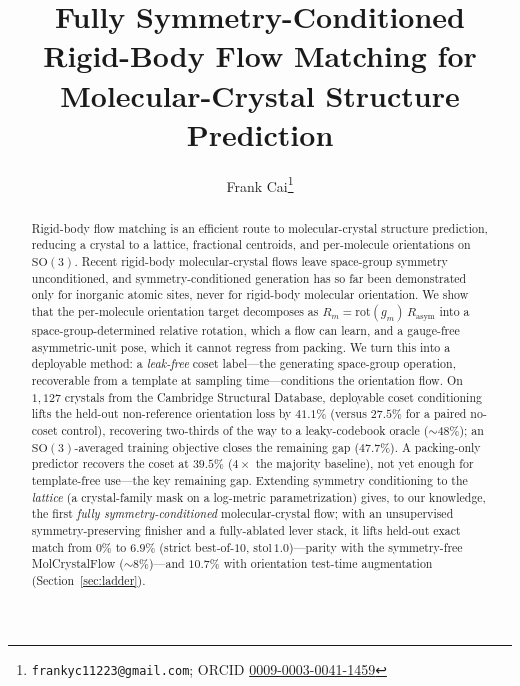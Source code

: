 \documentclass[10pt]{article}
\title{\bfseries Fully Symmetry-Conditioned Rigid-Body Flow Matching for
Molecular-Crystal Structure Prediction}
\author[1]{Frank Cai\thanks{\texttt{frankyc11223@gmail.com};
ORCID \href{https://orcid.org/0009-0003-0041-1459}{0009-0003-0041-1459}}}
\affil[1]{Purdue University, West Lafayette, IN, USA}
\date{}
\begin{document}
\maketitle

\begin{abstract}
\noindent
Rigid-body flow matching is an efficient route to molecular-crystal structure
prediction, reducing a crystal to a lattice, fractional centroids, and
per-molecule orientations on $\mathrm{SO}(3)$. Recent rigid-body
molecular-crystal flows leave space-group symmetry unconditioned, and
symmetry-conditioned generation has so far been demonstrated only for inorganic
atomic sites, never for rigid-body molecular orientation. We show that the
per-molecule orientation target decomposes as
$R_m=\mathrm{rot}(g_m)\,R_{\text{asym}}$ into a space-group-determined relative
rotation, which a flow can learn, and a gauge-free asymmetric-unit pose, which it
cannot regress from packing. We turn this into a deployable method: a
\emph{leak-free} coset label---the generating space-group operation, recoverable
from a template at sampling time---conditions the orientation flow. On $1{,}127$
crystals from the Cambridge Structural Database, deployable coset conditioning
lifts the held-out non-reference orientation loss by $41.1\%$ (versus $27.5\%$
for a paired no-coset control), recovering two-thirds of the way to a
leaky-codebook oracle ($\sim\!48\%$); an $\mathrm{SO}(3)$-averaged training
objective closes the remaining gap ($47.7\%$). A packing-only predictor recovers
the coset at $39.5\%$ ($4\times$ the majority baseline), not yet enough for
template-free use---the key remaining gap. Extending symmetry conditioning to the \emph{lattice} (a crystal-family mask
on a log-metric parametrization) gives, to our knowledge, the first \emph{fully
symmetry-conditioned} molecular-crystal flow; with an unsupervised
symmetry-preserving finisher and a fully-ablated lever stack, it lifts held-out
exact match from $0\%$ to $6.9\%$ (strict best-of-$10$,
$\text{stol}\,1.0$)---parity with the symmetry-free MolCrystalFlow ($\sim\!8\%$)---and
$10.7\%$ with orientation test-time augmentation (Section~\ref{sec:ladder}).
\end{abstract}

\end{document}
